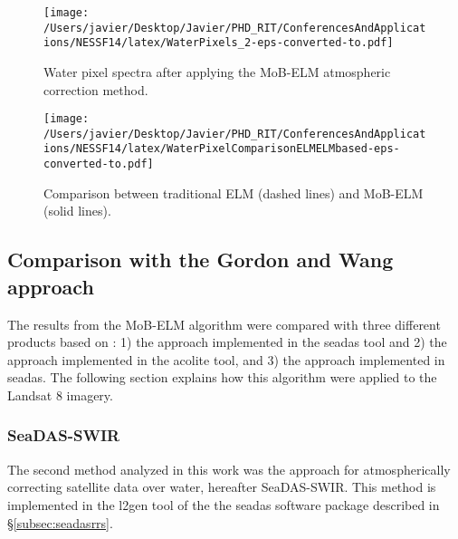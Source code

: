 \begin{figure}[htb]
    \centering
      \texttt{[image: /Users/javier/Desktop/Javier/PHD\_RIT/ConferencesAndApplications/NESSF14/latex/WaterPixels\_2-eps-converted-to.pdf]}
      \caption{Water pixel spectra after applying the MoB-ELM atmospheric correction method.}
      \label{fig:waterpxs}
\end{figure}


\begin{figure}[htb]
    \centering
      \texttt{[image: /Users/javier/Desktop/Javier/PHD\_RIT/ConferencesAndApplications/NESSF14/latex/WaterPixelComparisonELMELMbased-eps-converted-to.pdf]}
      \caption{Comparison between traditional ELM (dashed lines) and MoB-ELM (solid lines).}
      \label{fig:refcomp}
\end{figure}
\subsection{Comparison with the Gordon and Wang approach}
\label{subsec:GordonComp}
The results from the MoB-ELM algorithm were compared with three different products based on \cite{Gordon:1994}: 1) the \cite{Gordon:1994} approach implemented in the \gls{seadas} tool and 2) the \cite{Gordon:1994} approach implemented in the \gls{acolite} tool, and 3) the \cite{Ruddick:2000bs} approach implemented in \gls{seadas}. The following section explains how this algorithm were applied to the Landsat 8 imagery.
\subsubsection{SeaDAS-SWIR}
\label{subsubsec:seadasswir}
The second method analyzed in this work was the \cite{Gordon:1994} approach for atmospherically correcting satellite data over water, hereafter SeaDAS-SWIR. This method is implemented in the l2gen tool of the the \gls{seadas} software package described in \S\ref{subsec:seadasrrs}.


